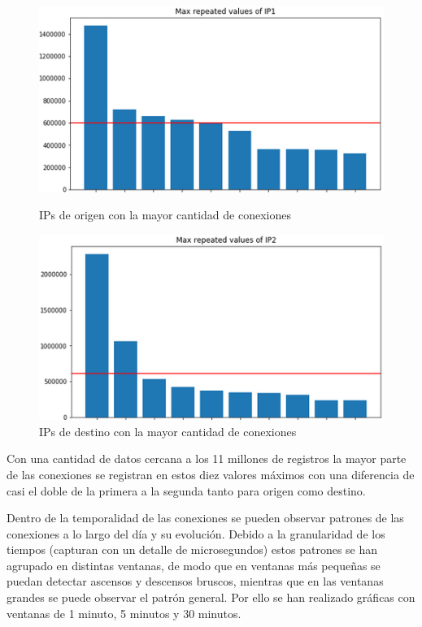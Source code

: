 \begin{figure}[H]
   \begin{minipage}{0.48\textwidth}
     \centering
     \includegraphics[width=1\linewidth]{figs/ip1.PNG}
     \caption{IPs de origen con la mayor cantidad de conexiones}
     \label{Fig:ip1}
   \end{minipage}\hfill
   \begin{minipage}{0.48\textwidth}
     \centering
     \includegraphics[width=1\linewidth]{figs/ip2}
     \caption{IPs de destino con la mayor cantidad de conexiones}
     \label{Fig:ip2}
   \end{minipage}
\end{figure}

Con una cantidad de datos cercana a los 11 millones de registros la mayor parte de las conexiones se registran en estos diez valores máximos con una diferencia de casi el doble de la primera a la segunda tanto para origen como destino.

Dentro de la temporalidad de las conexiones se pueden observar patrones de las conexiones a lo largo del día y su evolución. Debido a la granularidad de los tiempos (capturan con un detalle de microsegundos) estos patrones se han agrupado en distintas ventanas, de modo que en ventanas más pequeñas se puedan detectar ascensos y descensos bruscos, mientras que en las ventanas grandes se puede observar el patrón general. Por ello se han realizado gráficas con ventanas de 1 minuto, 5 minutos y 30 minutos.

